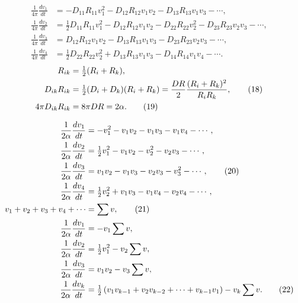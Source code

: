 \begin{align}
\frac{1}{4\pi}\frac{dv_1}{dt}
 &=-D_{11}R_{11}v_1^2-D_{12}R_{12}v_1v_2-D_{13}R_{13}v_1v_3-\cdots,\tag{17.1}\\
\frac{1}{4\pi}\frac{dv_2}{dt}
 &=\tfrac12D_{11}R_{11}v_1^2-D_{12}R_{12}v_1v_2-D_{22}R_{22}v_2^2-D_{23}R_{23}v_2v_3-\cdots,\tag{17.2}\\
\frac{1}{4\pi}\frac{dv_3}{dt}
 &=D_{12}R_{12}v_1v_2-D_{13}R_{13}v_1v_3-D_{23}R_{23}v_2v_3-\cdots,\tag{17.3}\\
\frac{1}{4\pi}\frac{dv_4}{dt}
 &=\tfrac12D_{22}R_{22}v_2^2+D_{13}R_{13}v_1v_3-D_{14}R_{14}v_1v_4-\cdots.\tag{17.4}
\end{align}
\begin{align}
R_{ik}&=\tfrac12(R_i+R_k),\notag\\
D_{ik}R_{ik}&=\tfrac12(D_i+D_k)(R_i+R_k)
=\frac{DR}{2}\frac{(R_i+R_k)^2}{R_iR_k},\tag{18}\\
4\pi D_{ik}R_{ik}&=8\pi DR=2\alpha.\tag{19}
\end{align}

\begin{align}
\frac{1}{2\alpha}\frac{dv_1}{dt}&=-v_1^2-v_1v_2-v_1v_3-v_1v_4-\cdots,\notag\\
\frac{1}{2\alpha}\frac{dv_2}{dt}&=\tfrac12v_1^2-v_1v_2-v_2^2-v_2v_3-\cdots,\notag\\
\frac{1}{2\alpha}\frac{dv_3}{dt}&=v_1v_2-v_1v_3-v_2v_3-v_3^2-\cdots,\tag{20}\\
\frac{1}{2\alpha}\frac{dv_4}{dt}&=\tfrac12v_2^2+v_1v_3-v_1v_4-v_2v_4-\cdots,\notag\\
v_1+v_2+v_3+v_4+\cdots&=\sum v,\tag{21}\\
\frac{1}{2\alpha}\frac{dv_1}{dt}&=-v_1\sum v,\notag\\
\frac{1}{2\alpha}\frac{dv_2}{dt}&=\tfrac12v_1^2-v_2\sum v,\notag\\
\frac{1}{2\alpha}\frac{dv_3}{dt}&=v_1v_2-v_3\sum v,\notag\\
\frac{1}{2\alpha}\frac{dv_k}{dt}
 &=\tfrac12\left(v_1v_{k-1}+v_2v_{k-2}+\cdots+v_{k-1}v_1\right)-v_k\sum v.\tag{22}
\end{align}

